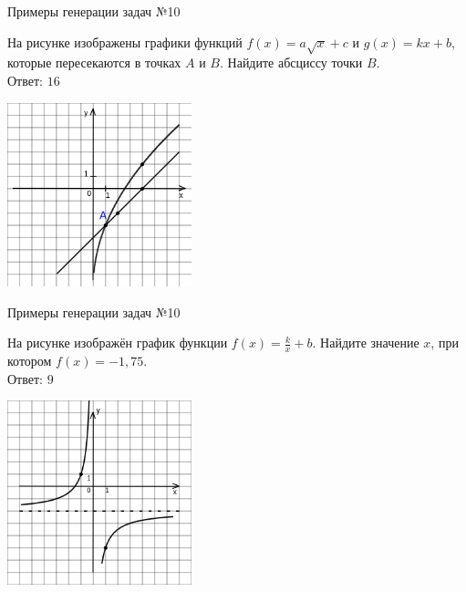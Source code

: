 \documentclass[aspectratio=169]{beamer}
\begin{document}
\begin{frame}{Примеры генерации задач №10}
    \begin{multicols}{2}
          
        На рисунке изображены графики функций $f(x)=a\sqrt{x}+c$ и $g(x)=kx+b$, которые пересекаются в точках $A$ и $B$. Найдите абсциссу точки $B$.\\
        
        Ответ: $16$

        \includegraphics[width=0.4\textwidth]{images/230486231093499n0}
    \end{multicols}
         
\end{frame}

\begin{frame}{Примеры генерации задач №10}
    \begin{multicols}{2}
        На рисунке изображён график функции $f(x)=\frac{k}{x}+b$. Найдите значение $x$, при котором $f(x)=-1,75$.\\

        Ответ: $9$

        \includegraphics[width=0.4\textwidth]{images/5535657652049n0.png}
    \end{multicols}
    
\end{frame}
\end{document}
